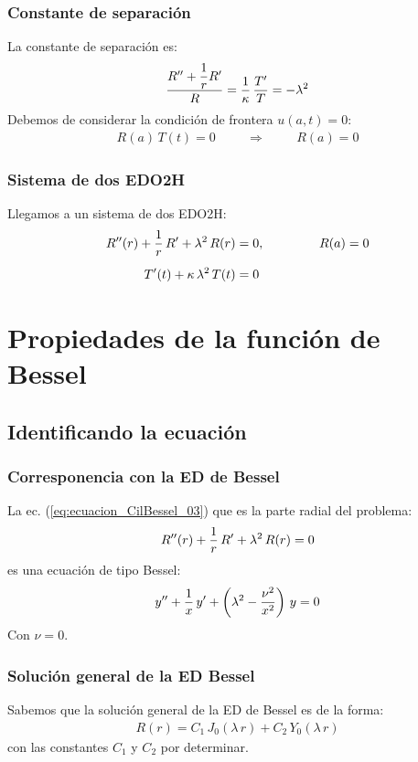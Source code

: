 \documentclass[12pt]{beamer}
\begin{document}
\begin{frame}
\frametitle{Constante de separación}
La constante de separación es:
\begin{align*}
\dfrac{{R}^{\prime \prime} + \dfrac{1}{r} {R}^{\prime}}{R} = \dfrac{1}{\kappa} \, \dfrac{{T}^{\prime}}{T} = -\lambda^{2}
\end{align*}
\pause
Debemos de considerar la condición de frontera $u(a, t) = 0$:
\pause
\begin{align*}
R(a) \, T(t) = 0 \hspace{1cm} \Rightarrow \hspace{1cm} R(a) = 0
\end{align*}
\end{frame}
\begin{frame}
\frametitle{Sistema de dos EDO2H}
Llegamos a un sistema de dos EDO2H:
\begin{align}
{R}^{\prime \prime}(r) + \dfrac{1}{r} \, {R}^{\prime} + \lambda^{2} \, R(r) &= 0, \hspace{1.5cm} R(a) = 0 \label{eq:ecuacion_CilBessel_03} \\[0.5em]
{T}^{\prime}(t) + \kappa \, \lambda^{2} \, T(t) &= 0 \label{eq:ecuacion_CilBessel_04}
\end{align}
\end{frame}

\section{Propiedades de la función de Bessel}
\subsection{Identificando la ecuación}

\begin{frame}
\frametitle{Corresponencia con la ED de Bessel}
La ec. (\ref{eq:ecuacion_CilBessel_03}) que es la parte radial del problema:
\begin{align*}
{R}^{\prime \prime}(r) + \dfrac{1}{r} \, {R}^{\prime} + \lambda^{2} \, R(r) = 0
\end{align*}
\pause
es una ecuación de tipo Bessel:
\begin{align*}
{y}^{\prime \prime} + \dfrac{1}{x} \, {y}^{\prime} + \left( \lambda^{2} - \dfrac{\nu^{2}}{x^{2}} \right) \, y = 0
\end{align*}
\pause
Con $\nu = 0$.
\end{frame}
\begin{frame}
\frametitle{Solución general de la ED Bessel}
Sabemos que la solución general de la ED de Bessel es de la forma:
\begin{align*}
R(r) = C_{1} \, J_{0} (\lambda \, r) + C_{2} \, Y_{0} (\lambda \, r)
\end{align*}
con las constantes $C_{1}$ y $C_{2}$ por determinar.
\end{frame}
\end{document}

